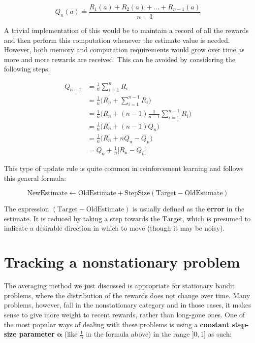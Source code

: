 \begin{equation*}
    Q_n(a) \doteq \frac{R_1(a) + R_2(a) + ... + R_{n-1}(a)}{n-1}
\end{equation*}

A trivial implementation of this would be to maintain a record of all the rewards and then perform this computation whenever the estimate value is needed. However, both memory and computation requirements would grow over time as more and more rewards are received. This can be avoided by considering the following steps:

\begin{equation*}
    \begin{split}
        Q_{n+1} & = \frac{1}{n} \sum_{i=1}^{n} R_i\\
        & = \frac{1}{n} \Big( R_n + \sum_{i=1}^{n-1} R_i \Big) \\
        & = \frac{1}{n} \Big( R_n + (n-1) \frac{1}{n-1} \sum_{i=1}^{n-1} R_i \Big) \\
        & = \frac{1}{n} \Big( R_n + (n-1) Q_n \Big) \\
        & = \frac{1}{n} \Big( R_n + n Q_n - Q_n \Big) \\
        & = Q_n + \frac{1}{n} \Big[R_n - Q_n \Big]
    \end{split}
\end{equation*}

This type of update rule is quite common in reinforcement learning and follows this general formula:

\begin{equation}
    \text{NewEstimate} \leftarrow \text{OldEstimate} + \text{StepSize}(\text{Target} - \text{OldEstimate})
    \label{eq:ch3-generalrlupdaterule}
\end{equation}

The expression $(\text{Target} - \text{OldEstimate})$ is usually defined as the \textbf{error} in the estimate. It is reduced by taking a step towards the $\text{Target}$, which is presumed to indicate a desirable direction in which to move (though it may be noisy).

\section{Tracking a nonstationary problem}
The averaging method we just discussed is appropriate for stationary bandit problems, where the distribution of the rewards does not change over time. Many problems, however, fall in the nonstationary category and in those cases, it makes sense to give more weight to recent rewards, rather than long-gone ones. One of the most popular ways of dealing with these problems is using a \textbf{constant step-size parameter} $\boldsymbol{\alpha}$ (like $\frac{1}{n}$ in the formula above) in the range $]0,1]$ as such:

